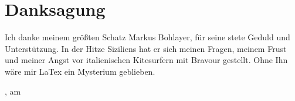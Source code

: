 
\chapter*{Danksagung}

\vspace{1.5cm}

\begin{center}
\raggedright
Ich danke meinem größten Schatz Markus Bohlayer, für seine stete Geduld und Unterstützung. In der Hitze Siziliens hat er sich meinen Fragen, meinem Frust und meiner Angst vor italienischen Kitesurfern mit Bravour gestellt. Ohne Ihn wäre mir LaTex ein Mysterium geblieben. 
\ \\
\raggedleft{\campusAuthor}
\end{center}

\vspace{1.5cm}

\campusCity, am \campusDate
